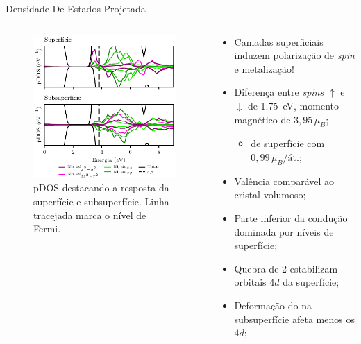 \begin{frame}{Densidade De Estados Projetada}
	\begin{columns}
		\begin{column}{.5\textwidth}
			\begin{figure}[t]
				\centering
				\includegraphics{../floats/pdos_nn_tf/pdos_nn_thinfilm_surface_subsurface.pdf}
				\caption{pDOS destacando a resposta da superfície e subsuperfície. Linha tracejada marca o nível de Fermi.\label{fig:pdosNblayer}}
			\end{figure}
		\end{column}
		\begin{column}{.5\textwidth}
			\begin{itemize}
				\item \alert{Camadas superficiais induzem polarização de \textit{spin} e metalização!}
				\item Diferença entre \textit{spins} $\uparrow$ e $\downarrow$ de \SI{1.75}{\electronvolt}, momento magnético de $3,\!95\,\mu_B$;
				\begin{itemize}
					\item {} de superfície com $0,\!99\,\mu_B/\text{át.}$;
				\end{itemize}
				\item Valência comparável ao cristal volumoso;
				\item Parte inferior da condução dominada por níveis de superfície;
				\item Quebra de 2  estabilizam orbitais  $4d$ da superfície;
				\item Deformação do  na subsuperfície afeta menos os  $4d$;
			\end{itemize}
		\end{column}
	\end{columns}
\end{frame}


